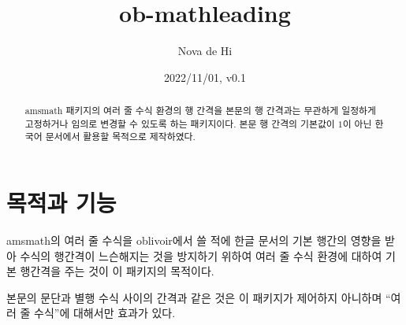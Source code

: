 \documentclass[a4paper,amsmath]{oblivoir}
\newcommand\pkg[1]{\textsf{#1}}
\begin{document}
\title{ob-mathleading}
\author{Nova de Hi}
\date{2022/11/01, v0.1}

\maketitle

\begin{abstract}
\pkg{amsmath} 패키지의 여러 줄 수식 환경의 행 간격을 본문의 행 간격과는 무관하게 일정하게
고정하거나 임의로 변경할 수 있도록 하는 패키지이다. 본문 행 간격의 기본값이 $1$이 아닌 
한국어 문서에서 활용할 목적으로 제작하였다.
\end{abstract}

\tableofcontents*

\section{목적과 기능}

\pkg{amsmath}의 여러 줄 수식을 \pkg{oblivoir}에서 쓸 적에 한글 문서의 기본 행간의 영향을 받아
수식의 행간격이 느슨해지는 것을 방지하기 위하여 여러 줄 수식 환경에 대하여 기본 행간격을 주는 것이 
이 패키지의 목적이다.

본문의 문단과 별행 수식 사이의 간격과 같은 것은 이 패키지가 제어하지 아니하며 ``여러 줄 수식''에 대해서만
효과가 있다.
\end{document}
